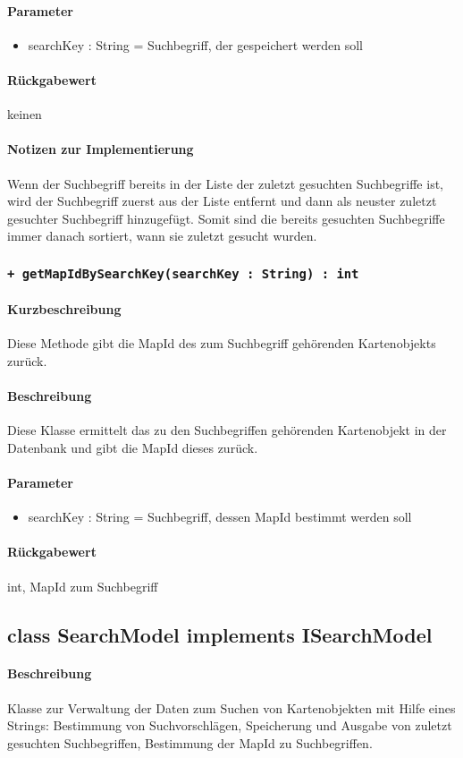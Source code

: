 \paragraph*{Parameter}
\begin{itemize}
    \item searchKey : String = Suchbegriff, der gespeichert werden soll
\end{itemize}
\paragraph*{Rückgabewert}
keinen
\paragraph*{Notizen zur Implementierung}
Wenn der Suchbegriff bereits in der Liste der zuletzt gesuchten Suchbegriffe ist, 
wird der Suchbegriff zuerst aus der Liste entfernt und dann als neuster zuletzt gesuchter Suchbegriff hinzugefügt.
Somit sind die bereits gesuchten Suchbegriffe immer danach sortiert, wann sie zuletzt gesucht wurden.

\subsubsection{\texttt{+ getMapIdBySearchKey(searchKey : String) : int}}%
\paragraph*{Kurzbeschreibung}
Diese Methode gibt die MapId des zum Suchbegriff gehörenden Kartenobjekts zurück.
\paragraph*{Beschreibung}
Diese Klasse ermittelt das zu den Suchbegriffen gehörenden Kartenobjekt in der Datenbank und gibt die MapId dieses zurück.
\paragraph*{Parameter}
\begin{itemize}
    \item searchKey : String = Suchbegriff, dessen MapId bestimmt werden soll
\end{itemize}
\paragraph*{Rückgabewert}
int, MapId zum Suchbegriff


\subsection{class SearchModel implements ISearchModel}
\paragraph*{Beschreibung}
Klasse zur Verwaltung der Daten zum Suchen von Kartenobjekten mit Hilfe eines Strings: 
Bestimmung von Suchvorschlägen, Speicherung und Ausgabe von zuletzt gesuchten Suchbegriffen, Bestimmung der MapId zu Suchbegriffen.